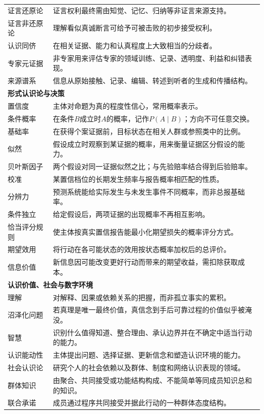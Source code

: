 \begin{longtable}{p{}p{}}
证言还原论 & 证言权利最终需由知觉、记忆、归纳等非证言来源支持。\\
证言非还原论 & 理解看似真诚断言可给予可被击败的初步接受权利。\\
认识同侪 & 在相关证据、能力和认真程度上大致相当的分歧者。\\
专家元证据 & 非专家用来评估专家的领域训练、记录、透明度、利益和纠错表现。\\
来源谱系 & 信息从原始接触、记录、编辑、转述到听者的生成和传播结构。\\
\multicolumn{2}{l}{\textbf{形式认识论与决策}}\\
置信度 & 主体对命题为真的程度性信心，常用概率表示。\\
条件概率 & 在条件$B$成立时$A$的概率，记作$P(A\mid B)$；方向不可任意交换。\\
基础率 & 在获得个案证据前，目标状态在相关人群或参照类中的比例。\\
似然 & 假设成立时观察到某证据的概率，用来衡量证据区分假设的能力。\\
贝叶斯因子 & 两个假设对同一证据似然之比；与先验赔率结合得到后验赔率。\\
校准 & 某置信档位的长期发生频率与报告概率相匹配的性质。\\
分辨力 & 预测系统能给实际发生与未发生事件不同概率，而非总报基础率。\\
条件独立 & 给定假设后，两项证据的出现概率不再相互影响。\\
恰当评分规则 & 使主体按真实置信报告能最小化期望损失的概率评分方式。\\
期望效用 & 将行动在各可能状态的效用按状态概率加权后的总评价。\\
信息价值 & 新信息因可能改变更好行动而带来的期望收益，需扣除获取成本。\\
\multicolumn{2}{l}{\textbf{认识价值、社会与数字环境}}\\
理解 & 对解释、因果或依赖关系的把握，而非孤立事实的累积。\\
沼泽化问题 & 若真理是唯一最终价值，真信念到手后可靠过程的价值似乎被淹没。\\
智慧 & 识别什么值得知道、整合理由、承认边界并在不确定中适当行动的能力。\\
认识能动性 & 主体提出问题、选择证据、更新信念和塑造认识环境的能力。\\
社会认识论 & 研究个人的社会依赖以及群体、制度和网络认识表现的领域。\\
群体知识 & 由聚合、共同接受或功能结构构成、不能简单等同成员知识总和的知识。\\
联合承诺 & 成员通过程序共同接受并据此行动的一种群体态度结构。\\

\end{longtable}
